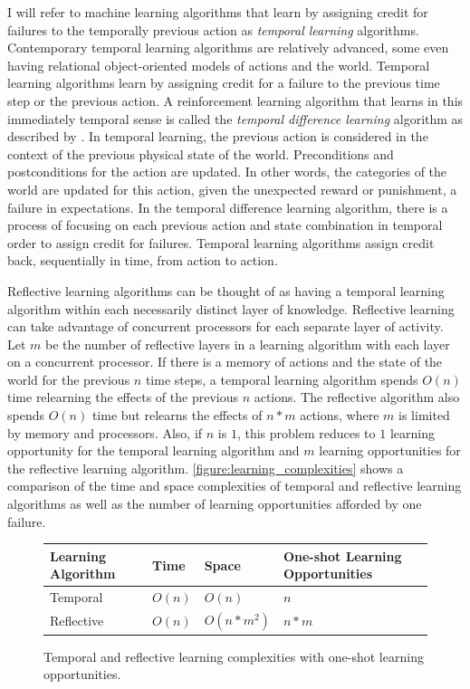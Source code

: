I will refer to machine learning algorithms that learn by assigning
credit for failures to the temporally previous action as
\emph{temporal learning} algorithms.  Contemporary temporal learning
algorithms are relatively advanced, some even having relational
object-oriented models of actions and the world.  Temporal learning
algorithms learn by assigning credit for a failure to the previous
time step or the previous action.  A reinforcement learning algorithm
that learns in this immediately temporal sense is called the
\emph{temporal difference learning} algorithm as described by
\cite*{kaelbling:1996}.  In temporal learning, the previous action is
considered in the context of the previous physical state of the world.
Preconditions and postconditions for the action are updated.  In other
words, the categories of the world are updated for this action, given
the unexpected reward or punishment, a failure in expectations.  In
the temporal difference learning algorithm, there is a process of
focusing on each previous action and state combination in temporal
order to assign credit for failures.  Temporal learning algorithms
assign credit back, sequentially in time, from action to action.

Reflective learning algorithms can be thought of as having a temporal
learning algorithm within each necessarily distinct layer of
knowledge.  Reflective learning can take advantage of concurrent
processors for each separate layer of activity.  Let $m$ be the number
of reflective layers in a learning algorithm with each layer on a
concurrent processor.  If there is a memory of actions and the state
of the world for the previous $n$ time steps, a temporal learning
algorithm spends $O(n)$ time relearning the effects of the previous
$n$ actions.  The reflective algorithm also spends $O(n)$ time but
relearns the effects of $n*m$ actions, where $m$ is limited by memory
and processors.  Also, if $n$ is $1$, this problem reduces to $1$
learning opportunity for the temporal learning algorithm and $m$
learning opportunities for the reflective learning algorithm.
{\mbox{\autoref{figure:learning_complexities}}} shows a comparison of
the time and space complexities of temporal and reflective learning
algorithms as well as the number of learning opportunities afforded by
one failure.
\begin{figure}
\center
\begin{tabular}{p{2cm}|p{2cm}|p{2cm}|p{3cm}}
Learning Algorithm & Time   & Space      & One-shot Learning Opportunities \\ \hline
Temporal           & $O(n)$ & $O(n)$     & $n$   \\
Reflective         & $O(n)$ & $O(n*m^2)$ & $n*m$ \\
\end{tabular}
\caption{Temporal and reflective learning complexities with one-shot learning opportunities.}
\label{figure:learning_complexities}
\end{figure}

